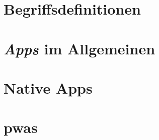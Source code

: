 
\section{Begriffsdefinitionen}
	\label{sec:2-1_begriffsdefinitionen}
	
	
\section{\textit{Apps} im Allgemeinen}
	\label{sec:2-2_apps}
	
	
\section{Native Apps}
	\label{sec:2-3_native_apps}
	

\section{\acfp{pwa}}
	\label{sec:2-4_pwa}
	